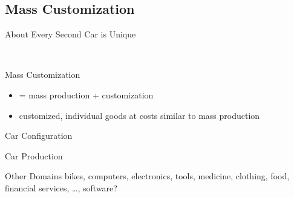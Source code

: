 \subsection{Mass Customization}
\begin{frame}{About Every Second Car is Unique}
	\centering{}
\end{frame}
\begin{frame}[label=MassCustomization]{\myframetitle\ }
	\begin{mycolumns}[widths={45}]
		\begin{definition}{Mass Customization}
			\begin{itemize}
			\item = mass production + customization
			\item customized, individual goods at costs similar to mass production
			\end{itemize}
		\end{definition}
		\begin{exampletight}{Car Configuration}
		\end{exampletight}
	\mynextcolumn
		\begin{exampletight}{Car Production}
		\end{exampletight}
		\begin{example}{Other Domains}
			bikes, computers, electronics, tools, medicine, clothing, food, financial services, \ldots, software?
		\end{example}
	\end{mycolumns}
\end{frame}

